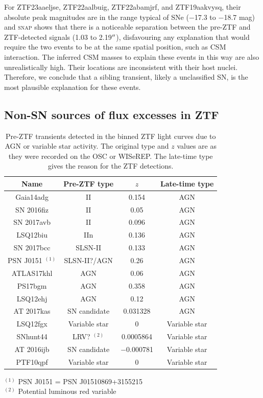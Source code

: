 \documentclass[a4paper,oneside,12pt, class=Latex/Classes/PhDthesisPSnPDF, crop=false]{standalone}
\begin{document}
For ZTF23aaeljse, ZTF22aalbuig, ZTF22abamjrf, and ZTF19aakvysq, their absolute peak magnitudes are in the range typical of SNe ($-$17.3 to $-$18.7 mag) and \textsc{snap} shows that there is a noticeable separation between the pre-ZTF and ZTF-detected signals (1.03 to 2.19$^{\prime\prime}$), disfavouring any explanation that would require the two events to be at the same spatial position, such as CSM interaction. The inferred CSM masses to explain these events in this way are also unrealistically high. Their locations are inconsistent with their host nuclei. Therefore, we conclude that a sibling transient, likely a unclassified SN, is the most plausible explanation for these events. 


\subsection{Non-SN sources of flux excesses in ZTF}
\label{non-sn}
\begin{table}
    \centering
    \caption{Pre-ZTF transients detected in the binned ZTF light curves due to AGN or variable star activity. The original type and $z$ values are as they were recorded on the OSC or WISeREP. The late-time type gives the reason for the ZTF detections.}
    \begin{tabular}{cccc}
        \hline
        \hline
        Name & Pre-ZTF type & $z$ & Late-time type\\
        \hline
        Gaia14adg & II & 0.154 & AGN\\
        SN 2016fiz & II & 0.05 & AGN\\
        SN 2017avb & II & 0.096 & AGN\\
        LSQ12biu & IIn & 0.136 & AGN\\
        SN 2017bcc & SLSN-II & 0.133 & AGN\\
        PSN J0151 $^{(1)}$ & SLSN-II?/AGN & 0.26 & AGN\\
        ATLAS17khl & AGN & 0.06 & AGN\\
        PS17bgm & AGN & 0.358 & AGN\\
        LSQ12ehj & AGN & 0.12 & AGN\\
        AT 2017kas & SN candidate & 0.031328 & AGN\\
        LSQ12fgx & Variable star & 0 & Variable star\\
        SNhunt44 & LRV? $^{(2)}$ & 0.0005864 & Variable star\\
        AT 2016ijb & SN candidate & $-$0.000781 & Variable star\\
        PTF10qpf & Variable star & 0 & Variable star\\
        \hline
    \end{tabular}
    \label{non-transient_table}
    \begin{flushleft}
        $^{(1)}$ PSN J0151 = PSN J01510869+3155215\\
        $^{(2)}$ Potential luminous red variable
    \end{flushleft}
\end{table}
\end{document}
